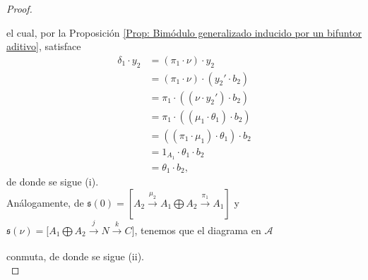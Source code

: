 \documentclass[tesis]{subfiles}
\begin{document}
\begin{proof}
    \begin{center}
    \end{center}
    el cual, por la Proposición \ref{Prop: Bimódulo generalizado inducido por un bifuntor aditivo}, satisface
    \begin{align*}
        \delta_1\cdot y_2 &= (\pi_1\cdot\nu)\cdot y_2 \\
                          &= (\pi_1\cdot\nu)\cdot(y_2'\cdot b_2) \\
                          &= \pi_1\cdot((\nu\cdot y_2')\cdot b_2) \\
                          &= \pi_1\cdot((\mu_1\cdot\theta_1)\cdot b_2) \\
                          &= ((\pi_1\cdot\mu_1)\cdot\theta_1)\cdot b_2 \\
                          &= 1_{A_1}\cdot\theta_1\cdot b_2 \\
                          &= \theta_1\cdot b_2,
    \end{align*}
    de donde se sigue (i). \\

    Análogamente, de $\mathfrak{s}(0) = [A_2\xrightarrow[]{\mu_2}A_1\bigoplus A_2\xrightarrow[]{\pi_1}A_1]$ y $\mathfrak{s}(\nu) = \big[A_1\bigoplus A_2\xrightarrow[]{j}N\xrightarrow[]{k}C\big]$, tenemos que el diagrama en $\mathscr{A}$
    \begin{center}
    \end{center}
    conmuta, de donde se sigue (ii). \\


\end{proof}
\end{document}
